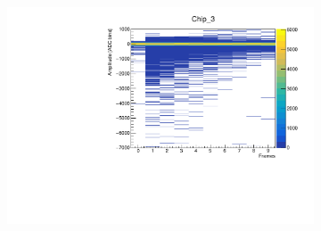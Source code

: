 \documentclass[12pt]{article}
\begin{document}
\begin{figure}[H]
\begin{subfigure}[b]{0.45\textwidth}
\end{subfigure}
\begin{subfigure}[b]{0.45\textwidth}
	\centering
	\includegraphics[width=\textwidth]{Chip_3_A2fr_hist}
\end{subfigure}


\end{figure}
\end{document}
